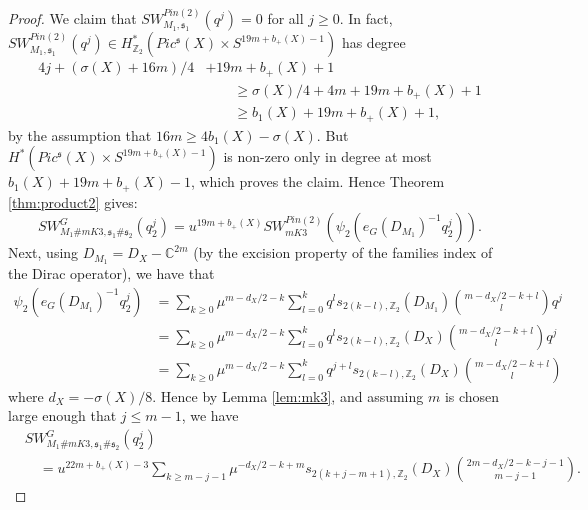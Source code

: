 \documentclass{amsart}
\theoremstyle{definition}
\theoremstyle{remark}
\numberwithin{equation}{section}
\begin{document}
\begin{proof}
We claim that $SW_{M_1,\mathfrak{s}_1}^{Pin(2)}(q^j) = 0$ for all $j \ge 0$. In fact, $SW_{M_1,\mathfrak{s}_1}^{Pin(2)}(q^j) \in H^*_{\mathbb{Z}_2}( Pic^{\mathfrak{s}}(X) \times S^{19m+b_+(X)-1} )$ has degree 
\begin{align*}
4j +(\sigma(X)+16m)/4 &  + 19m+b_+(X)+1 \\
& \quad \quad \ge \sigma(X)/4 + 4m+19m+b_+(X)+1 \\ & \quad \quad \ge b_1(X)+19m+b_+(X)+1,
\end{align*}
by the assumption that $16m \ge 4b_1(X) - \sigma(X)$. But $H^*( Pic^{\mathfrak{s}}(X) \times S^{19m+b_+(X)-1})$ is non-zero only in degree at most $b_1(X)+19m+b_+(X)-1$, which proves the claim. Hence Theorem \ref{thm:product2} gives:
\[
SW^{G}_{M_1 \# mK3 , \mathfrak{s}_1 \# \mathfrak{s}_2}(q_2^j) = u^{19m+b_+(X)} SW_{mK3}^{Pin(2)}( \psi_2( e_G(D_{M_1})^{-1} q_2^j ) ).
\]
Next, using $D_{M_1} = D_X - \mathbb{C}^{2m}$ (by the excision property of the families index of the Dirac operator), we have that
\begin{align*}
\psi_2( e_G(D_{M_1})^{-1} q_2^j ) &= \sum_{k \ge 0} \mu^{m-d_X/2-k} \sum_{l=0}^{k} q^l s_{2(k-l),\mathbb{Z}_2}(D_{M_1}) \binom{m-d_X/2 - k + l}{l} q^j \\
&= \sum_{k \ge 0} \mu^{m-d_X/2-k} \sum_{l=0}^{k} q^l s_{2(k-l),\mathbb{Z}_2}(D_{X}) \binom{m-d_X/2 - k + l}{l} q^j \\
&= \sum_{k \ge 0} \mu^{m-d_X/2-k} \sum_{l=0}^{k} q^{j+l} s_{2(k-l),\mathbb{Z}_2}(D_X) \binom{m-d_X/2 - k + l}{l}
\end{align*}
where $d_X = -\sigma(X)/8$. Hence by Lemma \ref{lem:mk3}, and assuming $m$ is chosen large enough that $j \le m-1$, we have
\begin{align*}
& SW^{G}_{M_1 \# mK3 , \mathfrak{s}_1 \# \mathfrak{s}_2}(q_2^j) \\
& \quad = u^{22m+b_+(X)-3} \! \! \! \! \sum_{k \ge m-j-1 } \! \! \! \! \mu^{-d_X/2-k+m}  s_{2(k+j-m+1),\mathbb{Z}_2}(D_X) \binom{2m-d_X/2 - k-j-1}{m-j-1}.
\end{align*}


\end{proof}
\end{document}
